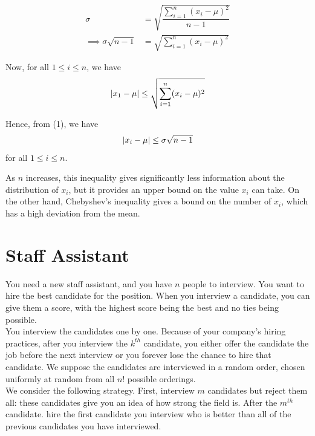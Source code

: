 \documentclass{article}
\begin{document}
\begin{equation}
\begin{aligned}
    \sigma &= \sqrt{\dfrac{\sum_{i=1}^{n}(x_i - \mu)^2}{n - 1}} \\
    \implies \sigma \sqrt{n - 1} &= \sqrt{\sum_{i=1}^{n}(x_i - \mu)^2}
\end{aligned}
\end{equation}

Now, for all $1\le i\le n$, we have
\begin{equation}
    |x_1-\mu|\le \sqrtsign{\sum_{i=1}^{n}(x_i-\mu)^2}
\end{equation}

Hence, from (1), we have
\begin{equation}
    |x_i-\mu|\le \sigma\sqrtsign{n-1}
\end{equation}
for all $1\le i\le n$.

As $n$ increases, this inequality gives significantly less information about the distribution of $x_i$, but it provides an upper bound on the value $x_i$ can take. On the other hand, Chebyshev's inequality gives a bound on the number of $x_i$, which has a high deviation from the mean.

\setcounter{equation}{0}

\section{Staff Assistant}
\begin{tcolorbox}
    You need a new staff assistant, and you have $n$ people to interview. You want to hire the best
    candidate for the position. When you interview a candidate, you can give them a score, with the
    highest score being the best and no ties being possible.
    \\[5pt]
    You interview the candidates one by one. Because of your company’s hiring practices, after you
    interview the $k^{th}$ candidate, you either offer the candidate the job before the next interview
    or you forever lose the chance to hire that candidate. We suppose the candidates are interviewed in
    a random order, chosen uniformly at random from all $n!$ possible orderings.
    \\[5pt]    
    We consider the following strategy. First, interview $m$ candidates but reject them all: these
    candidates give you an idea of how strong the field is. After the $m^{th}$ candidate. hire the first
    candidate you interview who is better than all of the previous candidates you have interviewed.
\end{tcolorbox}
\end{document}
